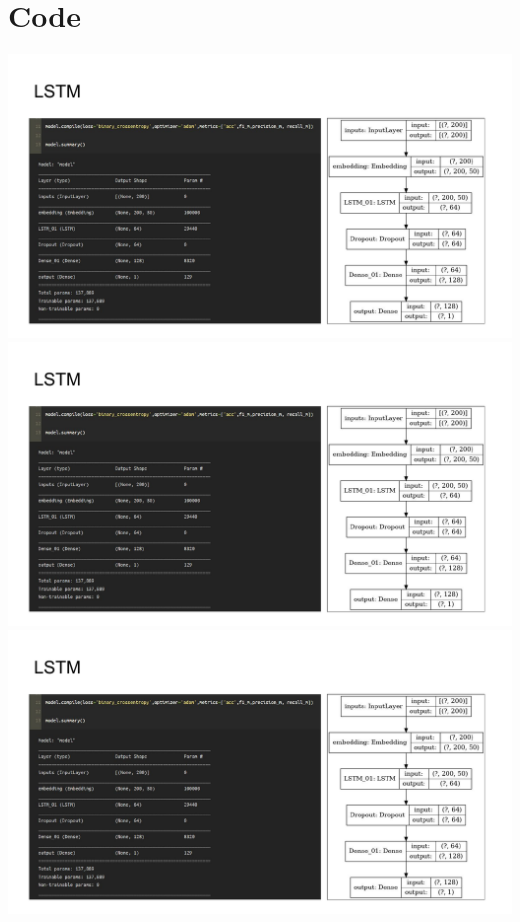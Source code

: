 
\chapter{Code} %

\label{appendix_code} %


\includegraphics[page=1,width=1.1\textwidth,left]{Appendices/code_appendix.pdf}
\clearpage
\includegraphics[page=2,width=1.1\textwidth,left]{Appendices/code_appendix.pdf}
\newline
\newline
\includegraphics[page=3,width=1.1\textwidth,left]{Appendices/code_appendix.pdf}
